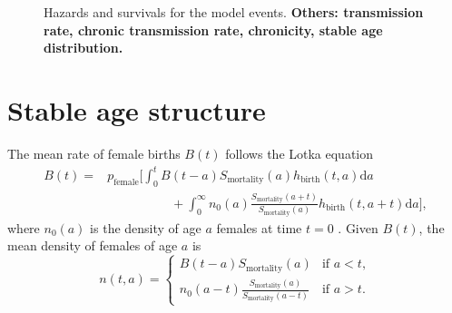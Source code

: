 \documentclass[12pt]{article}
\newcommand{\md}{\mathrm{d}}
\begin{document}
\begin{figure}
  \centering
  
  \caption{Hazards and survivals for the model events.
    \textbf{Others: transmission rate, chronic transmission rate,
      chronicity, stable age distribution.}}
  \label{fig:distributions}
\end{figure}


\section{Stable age structure}
\label{stable_age_structure}

The mean rate of female births $B(t)$ follows the Lotka equation
\begin{equation}
  \label{lotka}
  \begin{split}
    B(t) =&
    p_{\text{female}} \bigg[
      \int_0^t B(t - a)
      S_{\text{mortality}}(a)
      h_{\text{birth}}(t, a) \md a
    \\
    & \quad\quad\quad\quad\quad {} +
      \int_0^{\infty} n_0(a)
      \frac{S_{\text{mortality}}(a + t)}{S_{\text{mortality}}(a)}
      h_{\text{birth}}(t, a + t) \md a
    \bigg],
  \end{split}
\end{equation}
where $n_0(a)$ is the density of age $a$ females at time $t = 0$
\citetext{\citealp[Chapter VI, Section 29 on
  pp.~159--161]{harris_1963};
  \citealp[Chapter 20 on pp.~353--364]{kot_01}}.
Given $B(t)$, the mean density of females of age $a$ is
\begin{equation}
  n(t, a) =
  \begin{cases}
    B(t - a) S_{\text{mortality}}(a)
    & \text{if $a < t$},
    \\
    n_0(a - t)
    \frac{S_{\text{mortality}}(a)}{S_{\text{mortality}}(a - t)}
    & \text{if $a > t$}.
  \end{cases}
\end{equation}
\end{document}
